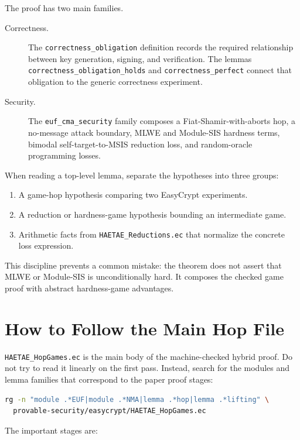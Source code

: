 \documentclass[11pt]{article}
\newcommand{\file}[1]{\nolinkurl{#1}}
\newcommand{\ec}[1]{\nolinkurl{#1}}
\begin{document}
The proof has two main families.

\begin{description}
  \item[Correctness.]
  The \ec{correctness_obligation} definition records the required relationship
  between key generation, signing, and verification.  The lemmas
  \ec{correctness_obligation_holds} and \ec{correctness_perfect} connect that
  obligation to the generic correctness experiment.

  \item[Security.]
  The \ec{euf_cma_security} family composes a Fiat-Shamir-with-aborts hop, a
  no-message attack boundary, MLWE and Module-SIS hardness terms, bimodal
  self-target-to-MSIS reduction loss, and random-oracle programming losses.
\end{description}

When reading a top-level lemma, separate the hypotheses into three groups:

\begin{enumerate}[leftmargin=*]
  \item A game-hop hypothesis comparing two EasyCrypt experiments.
  \item A reduction or hardness-game hypothesis bounding an intermediate game.
  \item Arithmetic facts from \file{HAETAE_Reductions.ec} that normalize the
  concrete loss expression.
\end{enumerate}

This discipline prevents a common mistake: the theorem does not assert that
MLWE or Module-SIS is unconditionally hard.  It composes the checked game proof
with abstract hardness-game advantages.

\section{How to Follow the Main Hop File}

\file{HAETAE_HopGames.ec} is the main body of the machine-checked hybrid proof.
Do not try to read it linearly on the first pass.  Instead, search for the
modules and lemma families that correspond to the paper proof stages:

\begin{lstlisting}[language=bash]
rg -n "module .*EUF|module .*NMA|lemma .*hop|lemma .*lifting" \
  provable-security/easycrypt/HAETAE_HopGames.ec
\end{lstlisting}

The important stages are:
\end{document}
